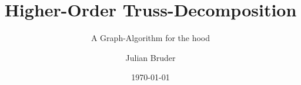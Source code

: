 \title[Higher-Order Truss-Decomposition]{Higher-Order Truss-Decomposition}
\subtitle{A Graph-Algorithm for the hood}
\author{Julian Bruder}
\newcommand{\faculty}{Fakultät Informatik und Medien}
\newcommand{\university}{HTWK Leipzig}
\newcommand{\universityLong}{Hochschule für Technik, Wirtschaft und Kultur Leipzig}
\date{\today}





